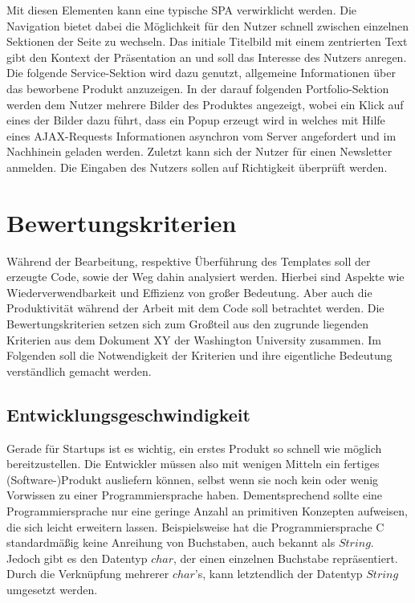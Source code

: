 Mit diesen Elementen kann eine typische SPA verwirklicht werden. Die Navigation bietet dabei die Möglichkeit für den Nutzer schnell zwischen einzelnen Sektionen der Seite zu wechseln. Das initiale Titelbild mit einem zentrierten Text gibt den Kontext der Präsentation an und soll das Interesse des Nutzers anregen. Die folgende Service-Sektion wird dazu genutzt, allgemeine Informationen über das beworbene Produkt anzuzeigen. In der darauf folgenden Portfolio-Sektion werden dem Nutzer mehrere Bilder des Produktes angezeigt, wobei ein Klick auf eines der Bilder dazu führt, dass ein Popup erzeugt wird in welches mit Hilfe eines AJAX-Requests Informationen asynchron vom Server angefordert und im Nachhinein geladen werden. Zuletzt kann sich der Nutzer für einen Newsletter anmelden. Die Eingaben des Nutzers sollen auf Richtigkeit überprüft werden.


\section{Bewertungskriterien}
\label{sec:Bewertungskriterien}
Während der Bearbeitung, respektive Überführung des Templates soll der erzeugte Code, sowie der Weg dahin analysiert werden. Hierbei sind Aspekte wie Wiederverwendbarkeit und Effizienz von großer Bedeutung. Aber auch die Produktivität während der Arbeit mit dem Code soll betrachtet werden. Die Bewertungskriterien setzen sich zum Großteil aus den zugrunde liegenden Kriterien aus dem Dokument XY der Washington University zusammen. Im Folgenden soll die Notwendigkeit der Kriterien und ihre eigentliche Bedeutung verständlich gemacht werden.

\subsection{Entwicklungsgeschwindigkeit}
\label{sec:Entwicklungsgeschwindigkeit}
Gerade für Startups ist es wichtig, ein erstes Produkt so schnell wie möglich bereitzustellen. Die Entwickler müssen also mit wenigen Mitteln ein fertiges (Software-)Produkt ausliefern können, selbst wenn sie noch kein oder wenig Vorwissen zu einer Programmiersprache haben.
Dementsprechend sollte eine Programmiersprache nur eine geringe Anzahl an primitiven Konzepten aufweisen, die sich leicht erweitern lassen. Beispielsweise hat die Programmiersprache C standardmäßig keine Anreihung von Buchstaben, auch bekannt als $String$. Jedoch gibt es den Datentyp $char$, der einen einzelnen Buchstabe repräsentiert. Durch die Verknüpfung mehrerer $char$'s, kann letztendlich der Datentyp $String$ umgesetzt werden.


